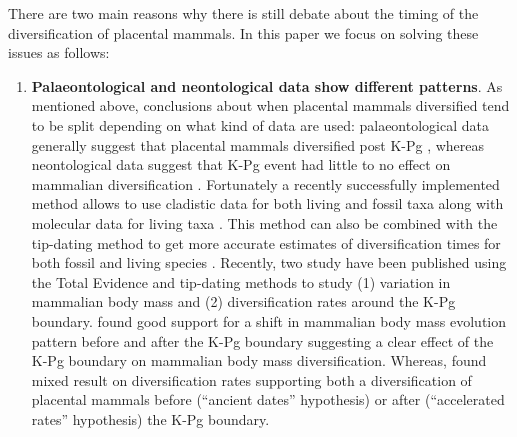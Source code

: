 \documentclass[12pt,letterpaper]{article}
\begin{document}
There are two main reasons why there is still debate about the timing of the diversification of placental mammals. In this paper we focus on solving these issues as follows:
\begin{enumerate}
    \item \textbf{Palaeontological and neontological data show different patterns}. %
    As mentioned above, conclusions about when placental mammals diversified tend to be split depending on what kind of data are used: palaeontological data generally suggest that placental mammals diversified post K-Pg \citep[e.g.][]{O'Leary08022013}, whereas neontological data suggest that K-Pg event had little to no effect on mammalian diversification \citep{bininda2007delayed,meredithimpacts2011,Stadler12042011}.
    Fortunately a recently successfully implemented method allows to use cladistic data for both living and fossil taxa along with molecular data for living taxa \citep[the Total Evidence method;][]{eernissetaxonomic1993,ronquista2012}.
    This method can also be combined with the tip-dating method \citep{ronquista2012,Wood01032013} to get more accurate estimates of diversification times for both fossil and living species \citep[but see][]{Arcila2015131}.
    Recently, two study have been published using the Total Evidence and tip-dating methods to study (1) variation in mammalian body mass \citep{Slater2012MEE} and (2) diversification rates \citep{beckancient2014} around the K-Pg boundary.
    \cite{Slater2012MEE} found good support for a shift in mammalian body mass evolution pattern before and after the K-Pg boundary suggesting a clear effect of the K-Pg boundary on mammalian body mass diversification.
    Whereas, \cite{beckancient2014} found mixed result on diversification rates supporting both a diversification of placental mammals before (``ancient dates'' hypothesis) or after (``accelerated rates'' hypothesis) the K-Pg boundary. %


\end{enumerate}
\end{document}
